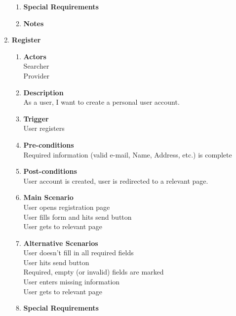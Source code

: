 \documentclass{scrreprt}
\begin{document}
\begin{enumerate}
\begin{enumerate}
		\item \textbf{Special Requirements} \\

		\item \textbf{Notes} \\
	\end{enumerate}

	\item \textbf{Register}
	\begin{enumerate}
		\item \textbf{Actors}  \\
			Searcher \\
			Provider \\

		\item \textbf{Description} \\
			As a user, I want to create a personal user account. \\
			
		\item \textbf{Trigger} \\
			User registers\\

		\item \textbf{Pre-conditions} \\
			Required information (valid e-mail, Name, Address, etc.) is complete\\

		\item \textbf{Post-conditions} \\
			User account is created, user is redirected to a relevant page.\\

		\item \textbf{Main Scenario} \\
			User opens registration page \\
			User fills form and hits send button \\
			User gets to relevant page \\

		\item \textbf{Alternative Scenarios} \\
			User doesn't fill in all required fields\\
			User hits send button\\
			Required, empty (or invalid) fields are marked\\
			User enters missing information\\
			User gets to relevant page\\
		\item \textbf{Special Requirements} \\


\end{enumerate}
\end{enumerate}
\end{document}
